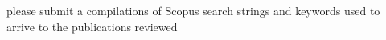 please submit a compilations of Scopus search strings and keywords used to arrive to the publications reviewed 